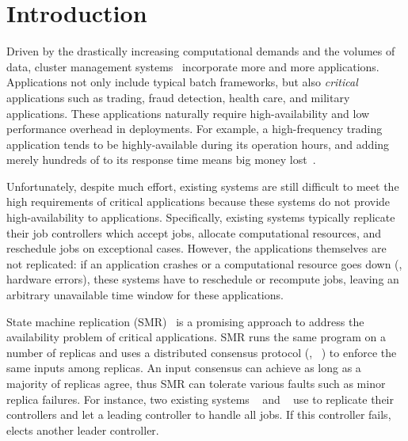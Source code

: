 \section{Introduction} \label{sec:intro}

Driven by the drastically increasing computational demands and the volumes of 
data, cluster 
management systems~\cite{borg:eurosys15,mesos:nsdi11,tupperware,yarn:socc13,
autopilot:sosp07,quincy:sosp09,apollo:osdi14,fuxi:vldb14} 
incorporate more and more applications. Applications not only include typical 
batch frameworks, but also \emph{critical} applications such as trading, fraud 
detection, health care, and military applications. These applications naturally 
require high-availability and low performance overhead in deployments. For 
example, a high-frequency trading application tends to be highly-available 
during its operation hours, and adding merely hundreds of \us to its response 
time means big money lost~\cite{nosql:finance}.


Unfortunately, despite much effort, existing systems are still difficult to 
meet the high requirements of critical applications because these systems do 
not provide high-availability to applications. Specifically, existing 
systems typically replicate their job controllers which accept jobs, 
allocate computational resources, and reschedule jobs on exceptional cases. 
However, the applications themselves are not replicated: if an application 
crashes or a computational resource goes down (\eg, hardware errors), these 
systems have to reschedule or recompute jobs, leaving an arbitrary 
unavailable time window for these applications.

State machine replication (SMR)~\cite{paxos} is a promising approach 
to address the availability problem of critical applications. SMR runs the 
same program on a number of replicas and uses a distributed consensus protocol 
(\eg, 
\paxos~\cite{paxos:practical,paxos,paxos:simple,paxos:complex,epaxos:sosp13}) 
to enforce the same inputs among 
replicas. An input consensus can achieve as long as a majority of replicas 
agree, thus SMR can tolerate various faults such as minor replica failures. For 
instance, two existing systems \borg~\cite{borg:eurosys15} and 
\mesos~\cite{mesos:nsdi11} use \paxos to replicate their controllers and let a 
leading controller to handle all jobs. If this controller fails, \paxos elects 
another leader controller.


